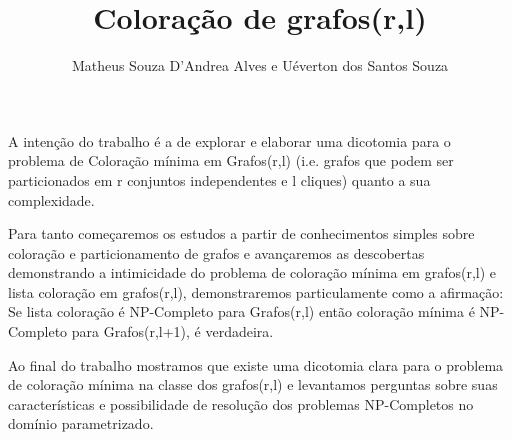 \documentclass[a4paper,11pt]{article}
\title{Coloração de grafos(r,l)}
\author{Matheus Souza D'Andrea Alves e Uéverton dos Santos Souza}
\begin{document}
  \maketitle
  A intenção do trabalho é a de explorar e elaborar uma dicotomia para o problema de Coloração mínima em Grafos(r,l) (i.e. grafos que podem ser particionados em r conjuntos independentes e l cliques) quanto a sua complexidade.
  
  Para tanto começaremos os estudos a partir de conhecimentos simples sobre coloração e particionamento de grafos e avançaremos as descobertas demonstrando a intimicidade do problema de coloração mínima em grafos(r,l) e lista coloração em grafos(r,l), demonstraremos particulamente como a afirmação: Se lista coloração é NP-Completo para Grafos(r,l) então coloração mínima é NP-Completo para Grafos(r,l+1), é verdadeira.
  
  Ao final do trabalho mostramos que existe uma dicotomia clara para o problema de coloração mínima na classe dos grafos(r,l) e levantamos perguntas sobre suas características e possibilidade de resolução dos problemas NP-Completos no domínio parametrizado.
\end{document}
